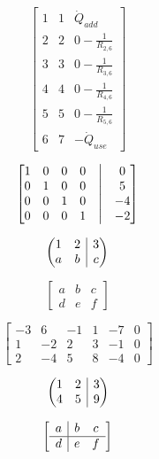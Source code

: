 \[
\begin{bmatrix}
	1 & 1 & \dot{Q}_{add}\\
	2 & 2 & 0 - \frac{1}{R_{2,6}}\\
	3 & 3 & 0 - \frac{1}{R_{3,6}}\\
	4 & 4 & 0 - \frac{1}{R_{4,6}}\\
	5 & 5 & 0 - \frac{1}{R_{5,6}}\\
	6 & 7 & -\dot{Q}_{use}
\end{bmatrix}
\]

$$
\begin{bmatrix}
	1 & 0 & 0 & 0 &\bigm| & 0 \\
	0 & 1 & 0 & 0 &\bigm| & 5 \\
	0 & 0 & 1 & 0 &\bigm| & -4 \\ 
	0 & 0 & 0 & 1 &\bigm| & -2
\end{bmatrix}
$$

\newenvironment{amatrix}[1]{%
	\left(\begin{array}{@{}*{#1}{c}|c@{}}
	}{%
	\end{array}\right)
}

\[
\begin{amatrix}{2}
	1 & 2 & 3 \\  a & b & c
\end{amatrix}
\]

\[
\left[
\begin{array}{cc|c}
	a & b & c \\
	d & e & f
\end{array}
\right]
\]

\[
\left[\begin{array}{rrrrr|r}
	-3 & 6 & -1 & 1 & -7 & 0\\
	1 & -2 & 2 & 3 & -1 & 0\\
	2 & -4 & 5 & 8 & -4 & 0
\end{array}\right]
\]

\[
\left(\hspace{-5pt}\begin{array}{cc|c}
	1 & 2 & 3 \\
	4 & 5 & 9
\end{array}\hspace{-5pt}\right)
\]

\[
    \left[\begin{array}{c|c c} 
	a & b & c\\ 
	\hline 
	d & e & f 
\end{array}\right] 
\]
\newpage